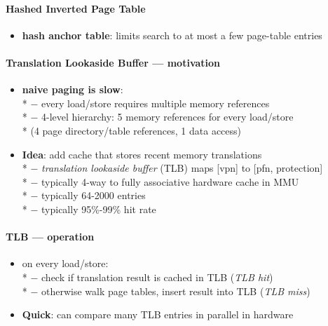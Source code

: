 \paragraph{Hashed Inverted Page Table}
\begin{itemize}
  \item \textbf{hash anchor table}: limits search to at most a few page-table entries
\end{itemize}

\paragraph{Translation Lookaside Buffer --- motivation}
\begin{itemize}
  \item \textbf{naive paging is slow}: \\*
    $ - $ every load/store requires multiple memory references \\*
    $ - $ 4-level hierarchy: 5 memory references for every load/store \\* \phantom{$ - $} \phantom{$ \cdot $} (4 page directory/table references, 1 data access)
  \item \textbf{Idea}: add cache that stores recent memory translations \\*
    $ - $ \emph{translation lookaside buffer} (TLB) maps [vpn] to [pfn, protection] \\*
    $ - $ typically 4-way to fully associative hardware cache in MMU \\*
    $ - $ typically 64-2000 entries \\*
    $ - $ typically 95\%-99\% hit rate
\end{itemize}

\paragraph{TLB --- operation}
\begin{itemize}
  \item on every load/store: \\*
    $ - $ check if translation result is cached in TLB (\emph{TLB hit}) \\*
    $ - $ otherwise walk page tables, insert result into TLB (\emph{TLB miss})
  \item \textbf{Quick}: can compare many TLB entries in parallel in hardware
\end{itemize}

